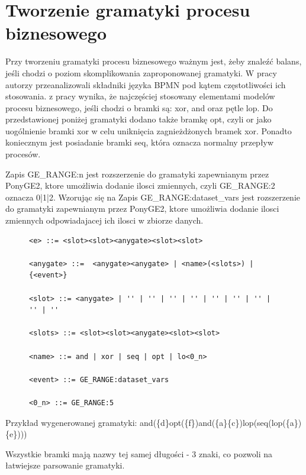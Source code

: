 \section{Tworzenie gramatyki procesu biznesowego}

Przy tworzeniu gramatyki procesu biznesowego ważnym jest, żeby znaleźć balans, jeśli chodzi o poziom skomplikowania zaproponowanej
gramatyki.  W pracy \cite{10.1007/978-3-540-69534-9_35} autorzy przeanalizowali składniki języka BPMN pod kątem częstotliwości ich stosowania. z pracy wynika, że najczęściej stosowany elementami modelów procesu biznesowego, jeśli chodzi o bramki są: xor, and oraz pętle lop. Do przedstawionej poniżej gramatyki dodano także bramkę opt, czyli or jako uogólnienie bramki xor w celu uniknięcia zagnieżdżonych bramek xor. Ponadto koniecznym jest posiadanie bramki seq, która oznacza normalny przepływ procesów.

Zapis GE{\_}RANGE:n jest rozszerzenie do gramatyki zapewnianym przez PonyGE2, ktore umożliwia dodanie ilosci zmiennych, czyli GE{\_}RANGE:2 oznacza 0|1|2.
Wzorując się na  Zapis GE{\_}RANGE:dataset{\_}vars jest rozszerzenie do gramatyki zapewnianym przez PonyGE2, ktore umożliwia dodanie ilosci zmiennych odpowiadajacej ich ilosci w zbiorze danych.

\begin{figure}[!ht]
\lstset{caption=Gramatyka procesu biznesowego, captionpos=b}
\lstset{label=src:grammar, frame=single}
\begin{lstlisting}
<e> ::= <slot><slot><anygate><slot><slot>

<anygate> ::=  <anygate><anygate> | <name>(<slots>) | {<event>}

<slot> ::= <anygate> | '' | '' | '' | '' | '' | '' | '' | '' | ''

<slots> ::= <slot><slot><anygate><slot><slot>

<name> ::= and | xor | seq | opt | lo<0_n>

<event> ::= GE_RANGE:dataset_vars

<0_n> ::= GE_RANGE:5
\end{lstlisting}
\end{figure}

Przykład wygenerowanej gramatyki:
and(\{d\}opt(\{f\})and(\{a\}\{c\})lop(seq(lop(\{a\})\{e\})))

Wszystkie bramki mają nazwy tej samej długości - 3 znaki, co pozwoli na łatwiejsze parsowanie gramatyki.

